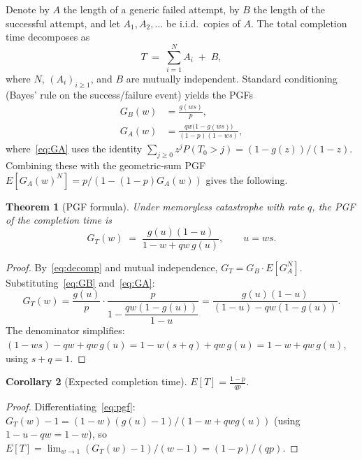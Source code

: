 \documentclass[11pt]{article}
\theoremstyle{plain}
\newtheorem{theorem}{Theorem}[section]
\newtheorem{corollary}[theorem]{Corollary}
\theoremstyle{definition}
\theoremstyle{remark}
\begin{document}
Denote by $A$ the length of a generic failed attempt, by $B$ the length of the successful attempt, and let $A_1, A_2, \ldots$ be i.i.d.\ copies of $A$.  The total completion time decomposes as
\begin{equation}\label{eq:decomp}
  T \;=\; \sum_{i=1}^{N} A_i \;+\; B,
\end{equation}
where $N$, $(A_i)_{i \geq 1}$, and $B$ are mutually independent.  Standard conditioning (Bayes' rule on the success/failure event) yields the PGFs\label{lem:cond-pgf}
\begin{align}
  G_B(w) &= \frac{g(ws)}{p}, \label{eq:GB} \\[4pt]
  G_A(w) &= \frac{qw\bigl(1 - g(ws)\bigr)}{(1-p)(1-ws)}, \label{eq:GA}
\end{align}
where~\eqref{eq:GA} uses the identity $\sum_{j \geq 0} z^j P(T_0 > j) = (1 - g(z))/(1-z)$.  Combining these with the geometric-sum PGF $E[G_A(w)^N] = p/(1-(1-p)G_A(w))$ gives the following.

\begin{theorem}[PGF formula]\label{thm:pgf}
Under memoryless catastrophe with rate $q$, the PGF of the completion time is
\begin{equation}\label{eq:pgf}
  G_T(w) \;=\; \frac{g(u)(1-u)}{1 - w + qw\,g(u)}, \qquad u = ws.
\end{equation}
\end{theorem}

\begin{proof}
By~\eqref{eq:decomp} and mutual independence, $G_T = G_B \cdot E[G_A^N]$.  Substituting~\eqref{eq:GB} and~\eqref{eq:GA}:
\[
  G_T(w) = \frac{g(u)}{p} \cdot \frac{p}{1 - \dfrac{qw(1-g(u))}{1-u}}
  = \frac{g(u)(1-u)}{(1-u) - qw(1-g(u))}.
\]
The denominator simplifies: $(1-ws) - qw + qw\,g(u) = 1 - w(s+q) + qw\,g(u) = 1 - w + qw\,g(u)$, using $s + q = 1$.
\end{proof}

\begin{corollary}[Expected completion time]\label{cor:ET}
$\displaystyle E[T] = \frac{1-p}{qp}$.
\end{corollary}

\begin{proof}
Differentiating~\eqref{eq:pgf}: $G_T(w)-1 = (1-w)(g(u)-1)/(1-w+qwg(u))$ (using $1-u-qw = 1-w$), so $E[T] = \lim_{w \to 1}(G_T(w)-1)/(w-1) = (1-p)/(qp)$.
\end{proof}

\end{document}
